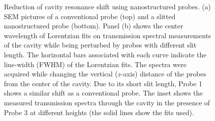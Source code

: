 \documentclass{osa-article}
\begin{document}
	\begin{figure}[htb!]
		\caption{Reduction of cavity resonance shift using nanostructured probes. (a) SEM pictures of a conventional probe (top) and a slitted nanostructured probe (bottom). Panel (b) shows the center wavelength of Lorentzian fits on transmission spectral measurements of the cavity while being perturbed by probes with different slit length. The horizontal bars associated with each curve indicate the line-width (FWHM) of the Lorentzian fits. The spectra were acquired while changing the vertical ($z$-axis) distance of the probes from the center of the cavity. Due to its short slit length, Probe 1 shows a similar shift as a conventional probe. The inset shows the measured transmission spectra through the cavity in the presence of Probe 3 at different heights (the solid lines show the fits used).}
		\label{figure3differentshifts}
	\end{figure}
	
\end{document}
